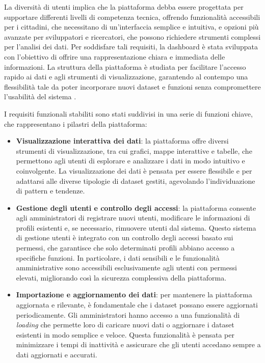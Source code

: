 La diversità di utenti implica che la piattaforma debba essere progettata per supportare differenti livelli di competenza tecnica, offrendo funzionalità accessibili per i cittadini, che necessitano di un'interfaccia semplice e intuitiva, e opzioni più avanzate per sviluppatori e ricercatori, che possono richiedere strumenti complessi per l’analisi dei dati. Per soddisfare tali requisiti, la dashboard è stata sviluppata con l’obiettivo di offrire una rappresentazione chiara e immediata delle informazioni. La struttura della piattaforma è studiata per facilitare l’accesso rapido ai dati e agli strumenti di visualizzazione, garantendo al contempo una flessibilità tale da poter incorporare nuovi dataset e funzioni senza compromettere l’usabilità del sistema \cite{shneiderman2016designing}.

I requisiti funzionali stabiliti sono stati suddivisi in una serie di funzioni chiave, che rappresentano i pilastri della piattaforma:
\begin{itemize}
    \item \textbf{Visualizzazione interattiva dei dati}: la piattaforma offre diversi strumenti di visualizzazione, tra cui grafici, mappe interattive e tabelle, che permettono agli utenti di esplorare e analizzare i dati in modo intuitivo e coinvolgente. La visualizzazione dei dati è pensata per essere flessibile e per adattarsi alle diverse tipologie di dataset gestiti, agevolando l’individuazione di pattern e tendenze.
    
    \item \textbf{Gestione degli utenti e controllo degli accessi}: la piattaforma consente agli amministratori di registrare nuovi utenti, modificare le informazioni di profili esistenti e, se necessario, rimuovere utenti dal sistema. Questo sistema di gestione utenti è integrato con un controllo degli accessi basato sui permessi, che garantisce che solo determinati profili abbiano accesso a specifiche funzioni. In particolare, i dati sensibili e le funzionalità amministrative sono accessibili esclusivamente agli utenti con permessi elevati, migliorando così la sicurezza complessiva della piattaforma.
    
    \item \textbf{Importazione e aggiornamento dei dati}: per mantenere la piattaforma aggiornata e rilevante, è fondamentale che i dataset possano essere aggiornati periodicamente. Gli amministratori hanno accesso a una funzionalità di \textit{loading} che permette loro di caricare nuovi dati o aggiornare i dataset esistenti in modo semplice e veloce. Questa funzionalità è pensata per minimizzare i tempi di inattività e assicurare che gli utenti accedano sempre a dati aggiornati e accurati.
    
\end{itemize}

